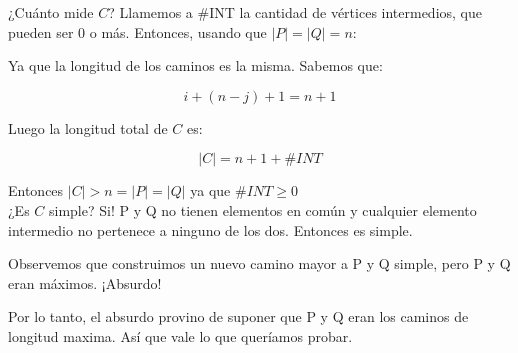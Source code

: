 \documentclass{article}
\begin{document}
¿Cuánto mide $C$? Llamemos a \#INT la cantidad de vértices intermedios, que pueden ser 0 o más. Entonces, usando que $|P| = |Q| = n$:

Ya que la longitud de los caminos es la misma. Sabemos que:  

\[ i + (n - j) + 1 = n + 1 \]

Luego la longitud total de $C$ es:

\[ |C| = n + 1 + \#INT \]

Entonces $|C| > n = |P| = |Q|$ ya que  $ \#INT \ge 0$\\ 
¿Es $C$ simple? Si! P y Q no tienen elementos en común y cualquier elemento intermedio no pertenece a ninguno de los dos. Entonces es simple.

Observemos que  construimos un nuevo camino mayor a P y Q simple, pero P y Q eran máximos. ¡Absurdo!

Por lo tanto, el absurdo provino de suponer que P y Q eran los caminos de longitud maxima. Así que vale lo que queríamos probar.
\end{document}
